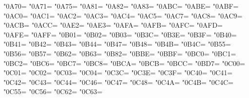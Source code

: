 \XeTeXcharclass"0A70=\KclassCM
\XeTeXcharclass"0A71=\KclassCM
\XeTeXcharclass"0A75=\KclassCM
\XeTeXcharclass"0A81=\KclassCM
\XeTeXcharclass"0A82=\KclassCM
\XeTeXcharclass"0A83=\KclassCM
\XeTeXcharclass"0ABC=\KclassCM
\XeTeXcharclass"0ABE=\KclassCM
\XeTeXcharclass"0ABF=\KclassCM
\XeTeXcharclass"0AC0=\KclassCM
\XeTeXcharclass"0AC1=\KclassCM
\XeTeXcharclass"0AC2=\KclassCM
\XeTeXcharclass"0AC3=\KclassCM
\XeTeXcharclass"0AC4=\KclassCM
\XeTeXcharclass"0AC5=\KclassCM
\XeTeXcharclass"0AC7=\KclassCM
\XeTeXcharclass"0AC8=\KclassCM
\XeTeXcharclass"0AC9=\KclassCM
\XeTeXcharclass"0ACB=\KclassCM
\XeTeXcharclass"0ACC=\KclassCM
\XeTeXcharclass"0AE2=\KclassCM
\XeTeXcharclass"0AE3=\KclassCM
\XeTeXcharclass"0AFA=\KclassCM
\XeTeXcharclass"0AFB=\KclassCM
\XeTeXcharclass"0AFC=\KclassCM
\XeTeXcharclass"0AFD=\KclassCM
\XeTeXcharclass"0AFE=\KclassCM
\XeTeXcharclass"0AFF=\KclassCM
\XeTeXcharclass"0B01=\KclassCM
\XeTeXcharclass"0B02=\KclassCM
\XeTeXcharclass"0B03=\KclassCM
\XeTeXcharclass"0B3C=\KclassCM
\XeTeXcharclass"0B3E=\KclassCM
\XeTeXcharclass"0B3F=\KclassCM
\XeTeXcharclass"0B40=\KclassCM
\XeTeXcharclass"0B41=\KclassCM
\XeTeXcharclass"0B42=\KclassCM
\XeTeXcharclass"0B43=\KclassCM
\XeTeXcharclass"0B44=\KclassCM
\XeTeXcharclass"0B47=\KclassCM
\XeTeXcharclass"0B48=\KclassCM
\XeTeXcharclass"0B4B=\KclassCM
\XeTeXcharclass"0B4C=\KclassCM
\XeTeXcharclass"0B55=\KclassCM
\XeTeXcharclass"0B56=\KclassCM
\XeTeXcharclass"0B57=\KclassCM
\XeTeXcharclass"0B62=\KclassCM
\XeTeXcharclass"0B63=\KclassCM
\XeTeXcharclass"0B82=\KclassCM
\XeTeXcharclass"0BBE=\KclassCM
\XeTeXcharclass"0BBF=\KclassCM
\XeTeXcharclass"0BC0=\KclassCM
\XeTeXcharclass"0BC1=\KclassCM
\XeTeXcharclass"0BC2=\KclassCM
\XeTeXcharclass"0BC6=\KclassCM
\XeTeXcharclass"0BC7=\KclassCM
\XeTeXcharclass"0BC8=\KclassCM
\XeTeXcharclass"0BCA=\KclassCM
\XeTeXcharclass"0BCB=\KclassCM
\XeTeXcharclass"0BCC=\KclassCM
\XeTeXcharclass"0BD7=\KclassCM
\XeTeXcharclass"0C00=\KclassCM
\XeTeXcharclass"0C01=\KclassCM
\XeTeXcharclass"0C02=\KclassCM
\XeTeXcharclass"0C03=\KclassCM
\XeTeXcharclass"0C04=\KclassCM
\XeTeXcharclass"0C3C=\KclassCM
\XeTeXcharclass"0C3E=\KclassCM
\XeTeXcharclass"0C3F=\KclassCM
\XeTeXcharclass"0C40=\KclassCM
\XeTeXcharclass"0C41=\KclassCM
\XeTeXcharclass"0C42=\KclassCM
\XeTeXcharclass"0C43=\KclassCM
\XeTeXcharclass"0C44=\KclassCM
\XeTeXcharclass"0C46=\KclassCM
\XeTeXcharclass"0C47=\KclassCM
\XeTeXcharclass"0C48=\KclassCM
\XeTeXcharclass"0C4A=\KclassCM
\XeTeXcharclass"0C4B=\KclassCM
\XeTeXcharclass"0C4C=\KclassCM
\XeTeXcharclass"0C55=\KclassCM
\XeTeXcharclass"0C56=\KclassCM
\XeTeXcharclass"0C62=\KclassCM
\XeTeXcharclass"0C63=\KclassCM

